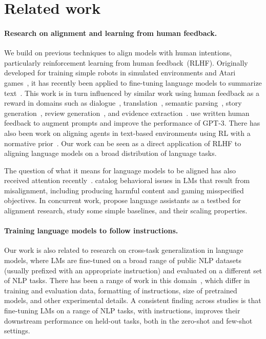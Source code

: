 \section{Related work}
\label{sec:related-work}

\paragraph{Research on alignment and learning from human feedback.} We build on previous techniques to align models with human intentions, particularly reinforcement learning from human feedback~(RLHF). Originally developed for training simple robots in simulated environments and Atari games~\citep{christiano2017deep,ibarz2018reward}, it has recently been applied to fine-tuning language models to summarize text~\citep{ziegler2019fine,stiennon2020learning,bohm2019better,wu2021recursively}. This work is in turn influenced by similar work using human feedback as a reward in domains such as dialogue~\citep{jaques2019way,yi2019towards,hancock2019learning}, translation~\citep{kreutzer2018can,bahdanau2016actor}, semantic parsing~\citep{lawrence2018improving}, story generation~\citep{zhou2020learning}, review generation~\citep{cho2018towards}, and evidence extraction~\citep{perez2019finding}.  \citet{madaan2022memory} use written human feedback to augment prompts and improve the performance of GPT-3. There has also been work on aligning agents in text-based environments using RL with a normative prior~\citep{nahian2021training}. Our work can be seen as a direct application of RLHF to aligning language models on a broad distribution of language tasks. 

The question of what it means for language models to be aligned has also received attention recently~\citep{gabriel2020artificial}. \citet{kenton2021alignment} catalog behavioral issues in LMs that result from misalignment, including producing harmful content and gaming misspecified objectives. In concurrent work, \citet{askell2021general} propose language assistants as a testbed for alignment research, study some simple baselines, and their scaling properties.

\paragraph{Training language models to follow instructions.} Our work is also related to research on cross-task generalization in language models, where LMs are fine-tuned on a broad range of public NLP datasets (usually prefixed with an appropriate instruction) and evaluated on a different set of NLP tasks. There has been a range of work in this domain~\citep{yi2019towards,mishra2021cross,wei2021finetuned,khashabi2020unifiedqa,sanh2021multitask,aribandi2021ext5}, which differ in training and evaluation data, formatting of instructions, size of pretrained models, and other experimental details. A consistent finding across studies is that fine-tuning LMs on a range of NLP tasks, with instructions, improves their downstream performance on held-out tasks, both in the zero-shot and few-shot settings. 

